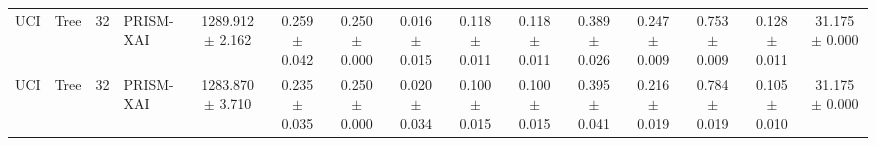 \begin{table}[t]
\begin{tabular}{llllccccccccccc}
UCI & Tree & 32 & PRISM-XAI & 1289.912 $\pm$ 2.162 & 0.259 $\pm$ 0.042 & 0.250 $\pm$ 0.000 & 0.016 $\pm$ 0.015 & 0.118 $\pm$ 0.011 & 0.118 $\pm$ 0.011 & 0.389 $\pm$ 0.026 & 0.247 $\pm$ 0.009 & 0.753 $\pm$ 0.009 & 0.128 $\pm$ 0.011 & 31.175 $\pm$ 0.000 \\
UCI & Tree & 32 & PRISM-XAI & 1283.870 $\pm$ 3.710 & 0.235 $\pm$ 0.035 & 0.250 $\pm$ 0.000 & 0.020 $\pm$ 0.034 & 0.100 $\pm$ 0.015 & 0.100 $\pm$ 0.015 & 0.395 $\pm$ 0.041 & 0.216 $\pm$ 0.019 & 0.784 $\pm$ 0.019 & 0.105 $\pm$ 0.010 & 31.175 $\pm$ 0.000 \\
\bottomrule
\end{tabular}
\end{table}
